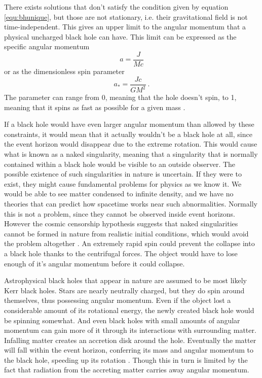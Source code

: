 \documentclass[english, oneside]{HYgradu}
\begin{document}
There exists solutions that don't satisfy the condition given by equation \ref{equ:bhunique}, but those are not stationary, i.e. their gravitational field is not time-independent. This gives an upper limit to the angular momentum that a physical uncharged black hole can have. This limit can be expressed as the specific angular momentum 
\begin{equation} \label{equ:angularmomentum}
a = \frac{J}{Mc}
\end{equation}
or as the dimensionless spin parameter
\begin{equation}
a_* = \frac{Jc}{GM^2} \ .
\end{equation}
The parameter can range from 0, meaning that the hole doesn't spin, to 1, meaning that it spins as fast as possible for a given mass \citep{middleton:2016}.

If a black hole would have even larger angular momentum than allowed by these constraints, it would mean that it actually wouldn't be a black hole at all, since the event horizon would disappear due to the extreme rotation. This would cause what is known as a naked singularity, meaning that a singularity that is normally contained within a black hole would be visible to an outside observer. The possible existence of such singularities in nature is uncertain. If they were to exist, they might cause fundamental problems for physics as we know it. We would be able to see matter condensed to infinite density, and we have no theories that can predict how spacetime works near such abnormalities. Normally this is not a problem, since they cannot be observed inside event horizons. However the cosmic censorship hypothesis suggests that naked singularities cannot be formed in nature from realistic initial conditions, which would avoid the problem altogether \citep{wald:1997}. An extremely rapid spin could prevent the collapse into a black hole thanks to the centrifugal forces. The object would have to lose enough of it's angular momentum before it could collapse.

Astrophysical black holes that appear in nature are assumed to be most likely Kerr black holes. Stars are nearly neutrally charged, but they do spin around themselves, thus possessing angular momentum. Even if the object lost a considerable amount of its rotational energy, the newly created black hole would be spinning somewhat. And even black holes with small amounts of angular momentum can gain more of it through its interactions with surrounding matter. Infalling matter creates an accretion disk around the hole. Eventually the matter will fall within the event horizon, conferring its mass and angular momentum to the black hole, speeding up its rotation \citep{bhphysics}. Though this in turn is limited by the fact that radiation from the accreting matter carries away angular momentum.
\end{document}
